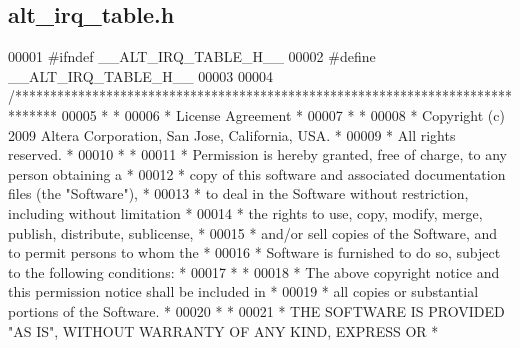 \subsection{alt\+\_\+irq\+\_\+table.\+h}
\label{alt__irq__table_8h_source}

\begin{DoxyCode}
00001 \textcolor{preprocessor}{#ifndef \_\_ALT\_IRQ\_TABLE\_H\_\_}
00002 \textcolor{preprocessor}{#define \_\_ALT\_IRQ\_TABLE\_H\_\_}
00003 
00004 \textcolor{comment}{/******************************************************************************}
00005 \textcolor{comment}{*                                                                             *}
00006 \textcolor{comment}{* License Agreement                                                           *}
00007 \textcolor{comment}{*                                                                             *}
00008 \textcolor{comment}{* Copyright (c) 2009      Altera Corporation, San Jose, California, USA.      *}
00009 \textcolor{comment}{* All rights reserved.                                                        *}
00010 \textcolor{comment}{*                                                                             *}
00011 \textcolor{comment}{* Permission is hereby granted, free of charge, to any person obtaining a     *}
00012 \textcolor{comment}{* copy of this software and associated documentation files (the "Software"),  *}
00013 \textcolor{comment}{* to deal in the Software without restriction, including without limitation   *}
00014 \textcolor{comment}{* the rights to use, copy, modify, merge, publish, distribute, sublicense,    *}
00015 \textcolor{comment}{* and/or sell copies of the Software, and to permit persons to whom the       *}
00016 \textcolor{comment}{* Software is furnished to do so, subject to the following conditions:        *}
00017 \textcolor{comment}{*                                                                             *}
00018 \textcolor{comment}{* The above copyright notice and this permission notice shall be included in  *}
00019 \textcolor{comment}{* all copies or substantial portions of the Software.                         *}
00020 \textcolor{comment}{*                                                                             *}
00021 \textcolor{comment}{* THE SOFTWARE IS PROVIDED "AS IS", WITHOUT WARRANTY OF ANY KIND, EXPRESS OR  *}

\end{DoxyCode}
